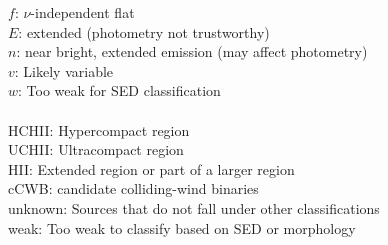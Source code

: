\begin{table*}[htp]
$f$: $\nu$-independent flat \\
$E$: extended (photometry not trustworthy) \\
$n$: near bright, extended emission (may affect photometry) \\
$v$: Likely variable \\
$w$: Too weak for SED classification \\
\newline \\
HCHII: Hypercompact \hii region \\
UCHII: Ultracompact \hii region \\
HII: Extended \hii region or part of a larger \hii region \\
cCWB: candidate colliding-wind binaries \\
unknown: Sources that do not fall under other classifications \\
weak: Too weak to classify based on SED or morphology \\

\end{table*}
